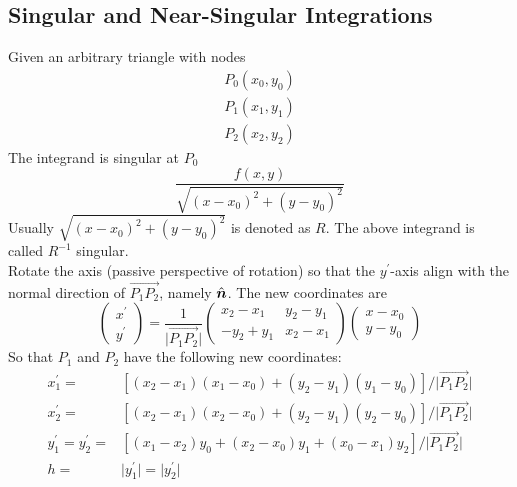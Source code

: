 \documentclass [10pt,letterpaper]{article}
\newcommand{\unitvectorsym}[1]{\hat{\vectorsym{#1}}}
\begin{document}
\subsection{Singular and Near-Singular Integrations}
\label{subsec:singular-and-near-singular-integrations}
Given an arbitrary triangle with nodes
\begin{equation*}
	\begin{split}
		P_0(x_0,y_0)
		\\
		P_1(x_1,y_1)
		\\
		P_2(x_2,y_2) 
	\end{split}
\end{equation*}
The integrand is singular at $P_0$
\begin{equation} \label{eq:singular-near-singular-integrand-2D}
	\frac{ f(x,y) }{ \sqrt{(x-x_0)^2+(y-y_0)^2} }
\end{equation}
Usually $\sqrt{(x-x_0)^2+(y-y_0)^2}$ is denoted as $R$. 
The above integrand is called $R^{-1}$ singular.
\\
Rotate the axis (passive perspective of rotation) so that the $y^{\prime}$-axis align with the normal direction of $\overrightarrow{P_1 P_2}$, namely $\unitvectorsym{n}$.
The new coordinates are
\begin{equation} \label{eq:singular-near-singular-rotate}
	\begin{pmatrix}
		x^{\prime}					\\
		y^{\prime}					
	\end{pmatrix}
	=
	\frac{1}{\lvert \overrightarrow{P_1 P_2} \rvert}
	\begin{pmatrix} 
		x_2-x_1 	& 	y_2-y_1		\\
		-y_2+y_1 	& 	x_2-x_1		
	\end{pmatrix}
	\begin{pmatrix}
		x-x_0					\\
		y-y_0
	\end{pmatrix}
\end{equation}
So that $P_1$ and $P_2$ have the following new coordinates:
\begin{subequations} \label{eq:result-singular-near-singular-x1p-x2p-y1p-y2p}
	\begin{align}
		x_1^{\prime}	
		=&	
		[
			(x_2-x_1)(x_1-x_0)
			+ 
			(y_2-y_1)(y_1-y_0)
		]
		/{\lvert \overrightarrow{P_1 P_2} \rvert}
		\\ 
		x_2^{\prime}	
		=&	
		[
			(x_2-x_1)(x_2-x_0)
			+ 
			(y_2-y_1)(y_2-y_0)
		]
		/{\lvert \overrightarrow{P_1 P_2} \rvert}
		\\
		y_1^{\prime}
		=y_2^{\prime}
		=& 
		[
			(x_1-x_2)y_0
			+
			(x_2-x_0)y_1
			+
			(x_0-x_1)y_2 
		]
		/{\lvert \overrightarrow{P_1 P_2} \rvert}
		\\
		h
		=&
		\lvert y_1^{\prime} \rvert
		=
		\lvert y_2^{\prime} \rvert
	\end{align}
\end{subequations}
\end{document}
